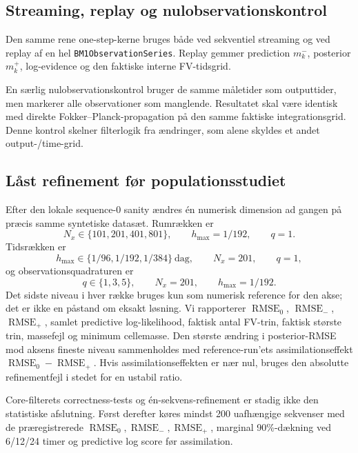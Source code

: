 \subsection{Streaming, replay og nulobservationskontrol}
Den samme rene one-step-kerne bruges både ved sekventiel streaming og ved replay
af en hel \texttt{BM1ObservationSeries}. Replay gemmer prediction \(m_k^-\),
posterior \(m_k^+\), log-evidence og den faktiske interne FV-tidsgrid.

En særlig nulobservationskontrol bruger de samme måletider som outputtider, men
markerer alle observationer som manglende. Resultatet skal være identisk med direkte
Fokker--Planck-propagation på den samme faktiske integrationsgrid. Denne kontrol
skelner filterlogik fra ændringer, som alene skyldes et andet output-/time-grid.

\subsection{Låst refinement før populationsstudiet}
Efter den lokale sequence-0 sanity ændres én numerisk dimension ad gangen på præcis
samme syntetiske datasæt. Rumrækken er
\[
 N_x\in\{101,201,401,801\},\qquad h_{\max}=1/192,\qquad q=1.
\]
Tidsrækken er
\[
 h_{\max}\in\{1/96,1/192,1/384\}\ \text{dag},\qquad N_x=201,\qquad q=1,
\]
og observationsquadraturen er
\[
 q\in\{1,3,5\},\qquad N_x=201,\qquad h_{\max}=1/192.
\]
Det sidste niveau i hver række bruges kun som numerisk reference for den akse; det er
ikke en påstand om eksakt løsning. Vi rapporterer \(\operatorname{RMSE}_0\),
\(\operatorname{RMSE}_-\), \(\operatorname{RMSE}_+\), samlet predictive
log-likelihood, faktisk antal FV-trin, faktisk største trin, massefejl og minimum
cellemasse. Den største ændring i posterior-RMSE mod aksens fineste niveau sammenholdes
med reference-run'ets assimilationseffekt \(\operatorname{RMSE}_0-\operatorname{RMSE}_+\).
Hvis assimilationseffekten er nær nul, bruges den absolutte refinementfejl i stedet
for en ustabil ratio.

Core-filterets correctness-tests og én-sekvens-refinement er stadig ikke den statistiske
afslutning. Først derefter køres mindst 200 uafhængige sekvenser med de præregistrerede
\(\operatorname{RMSE}_0,\operatorname{RMSE}_-,\operatorname{RMSE}_+\), marginal
90\%-dækning ved 6/12/24 timer og predictive log score før assimilation.

